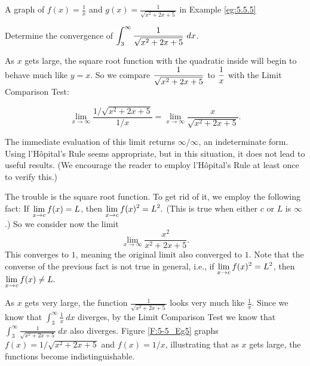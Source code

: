 \begin{marginfigure}[6cm]
\caption{A graph of $f(x)=\frac{1}{x}$ and $g(x)= \frac{1}{\sqrt{x^2+2x+5}}$ in Example \ref{eg:5.5.5}}
\label{F:5-5_Eg5}
\end{marginfigure}

\begin{example} \label{eg:5.5.5} %
Determine the convergence of $\displaystyle \int_3^{\infty} \frac{1}{\sqrt{x^2+2x+5}}\ dx$.

\solution
As $x$ gets large, the square root function with the quadratic inside will begin to behave much like $y=x$. So we compare $\displaystyle\frac{1}{\sqrt{x^2+2x+5}}$ to $\displaystyle\frac1x$ with the Limit Comparison Test:

$$
\lim_{x\to\infty} \frac{1/\sqrt{x^2+2x+5}}{1/x} = \lim_{x\to\infty}\frac{x}{\sqrt{x^2+2x+5}}.$$

The immediate evaluation of this limit returns $\infty/\infty$, an indeterminate form. Using l'H\^opital's Rule seems appropriate, but in this situation, it does not lead to useful results. (We encourage the reader to employ l'H\^opital's Rule at least once to verify this.)

The trouble is the square root function. To get rid of it, we employ the following fact: If $\displaystyle \lim_{x\to c} f(x) = L$, then $\displaystyle\lim_{x\to c} f(x)^2 = L^2.$ (This is true when either $c$ or $L$ is $\infty$.) So we consider now the limit
$$\lim_{x\to\infty} \frac{x^2}{x^2+2x+5}.$$ 
This converges to $1$, meaning the original limit also converged to $1$.  Note that the converse of the previous fact is not true in general, i.e., if $\displaystyle \lim_{x\to c} f(x)^2 = L^2$, then $\displaystyle\lim_{x\to c} f(x) \ne L.$

As $x$ gets very large, the function $\frac{1}{\sqrt{x^2+2x+5}}$ looks very much like $\frac1x.$ Since we know that $\int_3^{\infty} \frac1x\ dx$ diverges, by the Limit Comparison Test we know that $\int_3^\infty\frac{1}{\sqrt{x^2+2x+5}}\ dx$ also diverges. Figure \ref{F:5-5_Eg5} graphs $f(x)=1/\sqrt{x^2+2x+5}$ and $f(x)=1/x$, illustrating that as $x$ gets large, the functions become indistinguishable.


\end{example}